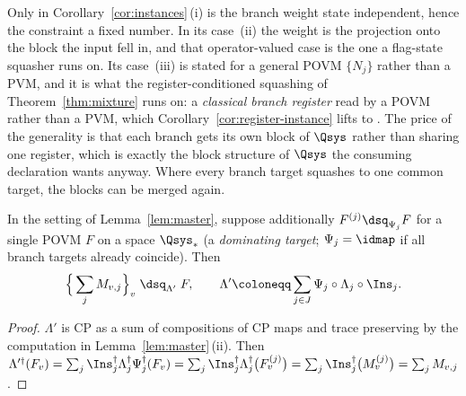 
Only in Corollary~\ref{cor:instances}\,(i) is the branch weight state
independent, hence the constraint a fixed number. In its case~(ii) the weight
is the projection onto the block the input fell in, and that operator-valued
case is the one a flag-state squasher runs on. Its case~(iii) is stated for a
general POVM $\{N_j\}$ rather than a PVM, and it is what the
register-conditioned squashing of Theorem~\ref{thm:mixture} runs on: a
\emph{classical branch register} read by a POVM rather than a PVM, which
Corollary~\ref{cor:register-instance} lifts to . The price
of the generality is that each branch gets its own block of $\Qsys$ rather
than sharing one register, which is exactly the block structure of $\Qsys$
the consuming declaration wants anyway. Where every branch target squashes to
one common target, the blocks can be merged again.

\begin{proposition}\label{prop:common}
In the setting of Lemma~\ref{lem:master}, suppose additionally
$F^{(j)}\dsq_{\Psi_j}F$ for a single POVM $F$ on a space $\Qsys_{*}$ (a
\emph{dominating target}; $\Psi_j=\idmap$ if all branch targets already
coincide). Then
\begin{equation*}
  \Big\{\sum_{j}M_{v,j}\Big\}_v\;\dsq_{\Lambda'}\;F,
  \qquad
  \Lambda'\coloneqq\sum_{j\in J}\Psi_j\circ\Lambda_j\circ\Ins_j .
\end{equation*}
\end{proposition}

\begin{proof}
$\Lambda'$ is CP as a sum of compositions of CP maps and trace preserving by
the computation in Lemma~\ref{lem:master}\,(ii). Then
$\Lambda'^{\dagger}(F_v)=\sum_j\Ins_j^{\dagger}\Lambda_j^{\dagger}
\Psi_j^{\dagger}(F_v)
=\sum_j\Ins_j^{\dagger}\Lambda_j^{\dagger}\big(F^{(j)}_v\big)
=\sum_j\Ins_j^{\dagger}\big(M^{(j)}_v\big)=\sum_jM_{v,j}$.
\end{proof}
